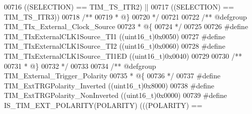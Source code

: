 \begin{DoxyCode}
00716                                                       \textcolor{preprocessor}{(}\textcolor{preprocessor}{(}\textcolor{preprocessor}{SELECTION}\textcolor{preprocessor}{)} \textcolor{preprocessor}{==} 
      TIM_TS_ITR2\textcolor{preprocessor}{)} \textcolor{preprocessor}{||}
00717                                                       \textcolor{preprocessor}{(}\textcolor{preprocessor}{(}\textcolor{preprocessor}{SELECTION}\textcolor{preprocessor}{)} \textcolor{preprocessor}{==} 
      TIM_TS_ITR3\textcolor{preprocessor}{)}\textcolor{preprocessor}{)}
00718 \textcolor{comment}{/**}
00719 \textcolor{comment}{  * @\}}
00720 \textcolor{comment}{  */}
00721 
00722 \textcolor{comment}{/** @defgroup TIM\_TIx\_External\_Clock\_Source }
00723 \textcolor{comment}{  * @\{}
00724 \textcolor{comment}{  */}
00725 
00726 \textcolor{preprocessor}{#}\textcolor{preprocessor}{define} \textcolor{preprocessor}{TIM\_TIxExternalCLK1Source\_TI1}      \textcolor{preprocessor}{(}\textcolor{preprocessor}{(}\textcolor{preprocessor}{uint16\_t}\textcolor{preprocessor}{)}0x0050\textcolor{preprocessor}{)}
00727 \textcolor{preprocessor}{#}\textcolor{preprocessor}{define} \textcolor{preprocessor}{TIM\_TIxExternalCLK1Source\_TI2}      \textcolor{preprocessor}{(}\textcolor{preprocessor}{(}\textcolor{preprocessor}{uint16\_t}\textcolor{preprocessor}{)}0x0060\textcolor{preprocessor}{)}
00728 \textcolor{preprocessor}{#}\textcolor{preprocessor}{define} \textcolor{preprocessor}{TIM\_TIxExternalCLK1Source\_TI1ED}    \textcolor{preprocessor}{(}\textcolor{preprocessor}{(}\textcolor{preprocessor}{uint16\_t}\textcolor{preprocessor}{)}0x0040\textcolor{preprocessor}{)}
00729 
00730 \textcolor{comment}{/**}
00731 \textcolor{comment}{  * @\}}
00732 \textcolor{comment}{  */}
00733 
00734 \textcolor{comment}{/** @defgroup TIM\_External\_Trigger\_Polarity }
00735 \textcolor{comment}{  * @\{}
00736 \textcolor{comment}{  */}
00737 \textcolor{preprocessor}{#}\textcolor{preprocessor}{define} \textcolor{preprocessor}{TIM\_ExtTRGPolarity\_Inverted}        \textcolor{preprocessor}{(}\textcolor{preprocessor}{(}\textcolor{preprocessor}{uint16\_t}\textcolor{preprocessor}{)}0x8000\textcolor{preprocessor}{)}
00738 \textcolor{preprocessor}{#}\textcolor{preprocessor}{define} \textcolor{preprocessor}{TIM\_ExtTRGPolarity\_NonInverted}     \textcolor{preprocessor}{(}\textcolor{preprocessor}{(}\textcolor{preprocessor}{uint16\_t}\textcolor{preprocessor}{)}0x0000\textcolor{preprocessor}{)}
00739 \textcolor{preprocessor}{#}\textcolor{preprocessor}{define} \textcolor{preprocessor}{IS\_TIM\_EXT\_POLARITY}\textcolor{preprocessor}{(}\textcolor{preprocessor}{POLARITY}\textcolor{preprocessor}{)} \textcolor{preprocessor}{(}\textcolor{preprocessor}{(}\textcolor{preprocessor}{(}\textcolor{preprocessor}{POLARITY}\textcolor{preprocessor}{)} \textcolor{preprocessor}{==} 

\end{DoxyCode}
